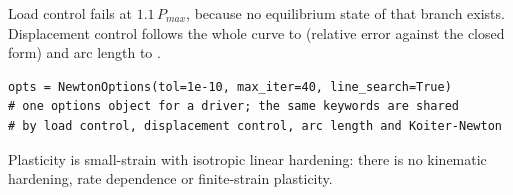 \newpage\thispagestyle{hl}
\par
{}
\begin{hlheadline}Load control fails at $1.1\,P_{max}$, because no equilibrium state of that branch exists. Displacement control follows the whole curve to \cnlTrussErrDC{} (relative error against the closed form) and arc length to \cnlTrussErrAL.\end{hlheadline}
\begin{lstlisting}[style=hlpy]
opts = NewtonOptions(tol=1e-10, max_iter=40, line_search=True)
# one options object for a driver; the same keywords are shared
# by load control, displacement control, arc length and Koiter-Newton
\end{lstlisting}
\begin{hllimit}Plasticity is small-strain with isotropic linear hardening: there is no kinematic hardening, rate dependence or finite-strain plasticity.\end{hllimit}
